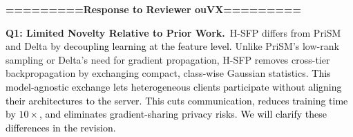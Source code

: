 \documentclass[10pt,twocolumn,letterpaper]{article}
\begin{document}

\textbf{=========Response to Reviewer ouVX=========}


\noindent\textbf{Q1: Limited Novelty Relative to Prior Work.}~H-SFP differs from PriSM \cite{niu2023overcoming} and Delta \cite{Niu_2024_CVPR} by \textcolor{black}{decoupling learning at the feature level.}
Unlike PriSM’s low-rank sampling or Delta’s need for gradient propagation, H-SFP removes cross-tier backpropagation by exchanging compact, class-wise Gaussian statistics. \textcolor{black}{This model-agnostic exchange lets heterogeneous clients participate without aligning their architectures to the server. This cuts communication, reduces training time by $10\times$, and eliminates gradient-sharing privacy risks. We will clarify these differences in the revision.}

\end{document}
